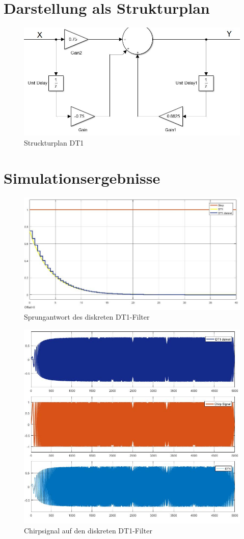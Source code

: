 \documentclass[12pt,a4paper]{report}
\begin{document}
\section{Darstellung als Strukturplan}
\begin{figure}[ht]
	\centering
	\includegraphics[width=0.8\linewidth]{marius/DT1}
	\caption{Struckturplan DT1}
	\label{fig:DT1}
\end{figure}


\section{Simulationsergebnisse}
\begin{figure}[ht]
	\centering
	\includegraphics[width=0.9\linewidth]{marius/DT1_Step}
	\caption{Sprungantwort des diskreten DT1-Filter}
	\label{fig:DT1_Step}
\end{figure}
\begin{figure}[ht]
	\centering
	\includegraphics[width=0.9\linewidth]{marius/DT1_Chrip_0,001-0,2Hz}
	\caption{Chirpsignal auf den diskreten DT1-Filter}
	\label{fig:DT1_Chirp}
\end{figure}
\end{document}
